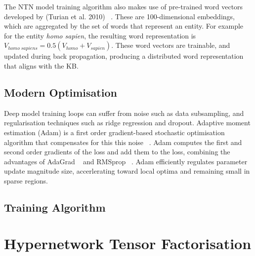 The NTN model training algorithm also makes use of pre-trained word vectors developed by (Turian et al. 2010) ~\citep{turian2010word}. These are 100-dimensional embeddings, which are aggregated by the set of words that represent an entity. For example for the entity \textit{homo sapien}, the resulting word representation is $V_{homo \; sapiens} = 0.5(V_{homo} + V_{sapien})$. These word vectors are trainable, and updated during back propagation, producing a distributed word representation that aligns with the KB.

\subsection{Modern Optimisation}

Deep model training loops can suffer from noise such as data subsampling, and regularisation techniques such as ridge regression and dropout. Adaptive moment estimation (Adam) is a first order gradient-based stochastic optimisation algorithm that compensates for this this noise ~\citep{kingma2014adam}. Adam computes the first and second order gradients of the loss and add them to the loss, combining the advantages of AdaGrad ~\citep{duchi2011adaptive} and RMSprop ~\citep{tieleman2012lecture}. Adam efficiently regulates parameter update magnitude size, accerlerating toward local optima and remaining small in sparse regions. \newline


\subsection{Training Algorithm}



\section{Hypernetwork Tensor Factorisation}

